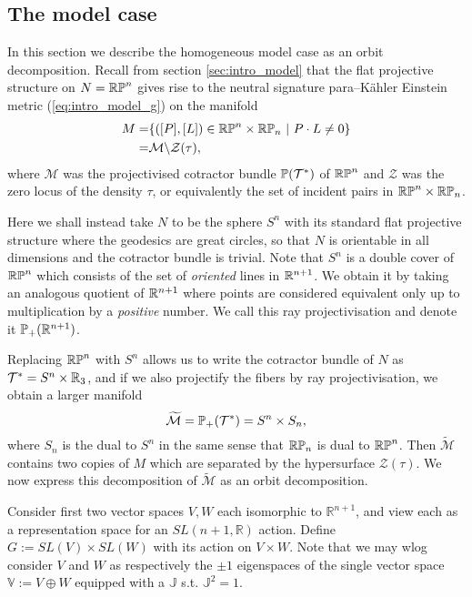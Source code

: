 \subsection{The model case}

In this section we describe the homogeneous model case as an orbit decomposition. Recall from section \ref{sec:intro_model} that the flat projective structure on $N=\mathbb{RP}^n$ gives rise to 
the neutral signature para--K\"ahler Einstein metric (\ref{eq:intro_model_g}) on the manifold
\begin{align*}
M=&\{([P],[L])\in\mathbb{RP}^n\times\mathbb{RP}_n\ |\ P\cdot L\neq 0\} \\
=& \mathcal{M}\backslash\mathcal{Z}(\tau),
\end{align*}
where $\mathcal{M}$ was the projectivised cotractor bundle $\mathbb{P}(\mathcal{T}^*)$ of $\mathbb{RP}^n$ and $\mathcal{Z}$ was the zero locus of the density $\tau$, or equivalently the set of incident pairs in $\mathbb{RP}^n\times\mathbb{RP}_n$.

Here we shall instead take $N$ to be the sphere $S^n$ with its standard flat projective structure where the geodesics are great circles, so that $N$ is orientable in all dimensions and the cotractor bundle is trivial. Note that $S^n$ is a double cover of $\mathbb{RP}^n$ which consists of the set of \textit{oriented} lines in $\mathbb{R}^{n+1}$. We obtain it by taking an analogous quotient of $\mathbb{R}^{n+1}$ where points are considered equivalent only up to multiplication by a \textit{positive} number. We call this ray projectivisation and denote it $\mathbb{P}_+(\mathbb{R}^{n+1})$.

Replacing $\mathbb{RP}^n$ with $S^n$ allows us to write the cotractor bundle of $N$ as $\mathcal{T}^*=S^n\times\mathbb{R}_3$, and if we also projectify the fibers by ray projectivisation, we obtain a larger manifold
\[
\widetilde{\mathcal{M}}=\mathbb{P}_+(\mathcal{T}^*)=S^n\times S_n,
\]
where $S_n$ is the dual to $S^n$ in the same sense that $\mathbb{RP}_n$ is dual to $\mathbb{RP}^n$. Then $\widetilde{\mathcal{M}}$ contains two copies of $M$ which are separated by the hypersurface $\mathcal{Z}(\tau)$. We now express this decomposition of $\widetilde{\mathcal{M}}$ as an orbit decomposition.

Consider first two vector spaces $V,W$ each isomorphic to $\mathbb{R}^{n+1}$, and view each as a representation space for an $SL(n+1,\mathbb{R})$ action. Define $G:= SL(V)\times SL(W)$ with its action on $V\times W$. Note that we may
wlog consider $V$ and $W$ as respectively the $\pm 1$ eigenspaces of the single vector space $\mathbb{V}:=V\oplus W$ equipped with a
$\mathbb{J}$ s.t. $\mathbb{J}^2=1$.

